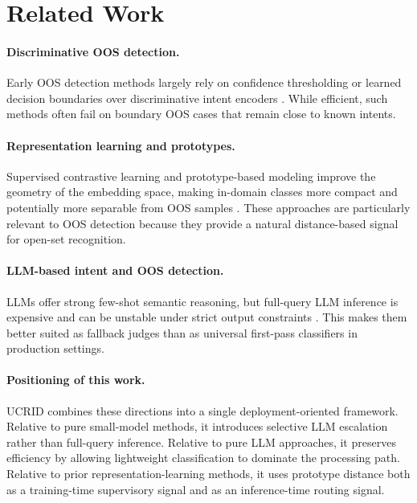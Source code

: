 \documentclass[11pt]{article}
\begin{document}
\section{Related Work}
\paragraph{Discriminative OOS detection.}
Early OOS detection methods largely rely on confidence thresholding or learned decision boundaries over discriminative intent encoders \citep{hendrycks2017baseline,zhang2021adb}. While efficient, such methods often fail on boundary OOS cases that remain close to known intents.

\paragraph{Representation learning and prototypes.}
Supervised contrastive learning and prototype-based modeling improve the geometry of the embedding space, making in-domain classes more compact and potentially more separable from OOS samples \citep{khosla2020supervised,khattak2020supcon}. These approaches are particularly relevant to OOS detection because they provide a natural distance-based signal for open-set recognition.

\paragraph{LLM-based intent and OOS detection.}
LLMs offer strong few-shot semantic reasoning, but full-query LLM inference is expensive and can be unstable under strict output constraints \citep{song2023chatgptintent,castillo2025lsr}. This makes them better suited as fallback judges than as universal first-pass classifiers in production settings.

\paragraph{Positioning of this work.}
UCRID combines these directions into a single deployment-oriented framework. Relative to pure small-model methods, it introduces selective LLM escalation rather than full-query inference. Relative to pure LLM approaches, it preserves efficiency by allowing lightweight classification to dominate the processing path. Relative to prior representation-learning methods, it uses prototype distance both as a training-time supervisory signal and as an inference-time routing signal.
\end{document}
